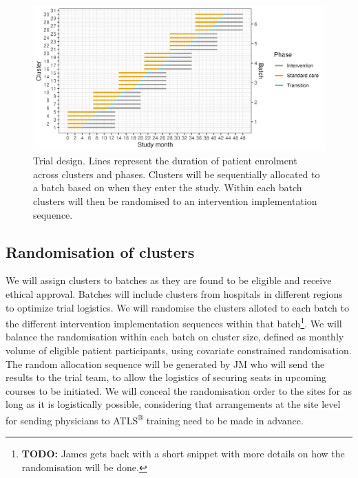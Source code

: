 \documentclass[
]{scrartcl}
\begin{document}
\begin{figure}

{\centering \includegraphics{trial-design-figure-30-clusters-5-sequences-6-batches-6-batches-overlap-4-min-standard-care-4-min-intervention-1-transition-months-0-transition-overlap.png}

}

\caption{\label{fig-trial-design}Trial design. Lines represent the
duration of patient enrolment across clusters and phases. Clusters will
be sequentially allocated to a batch based on when they enter the study.
Within each batch clusters will then be randomised to an intervention
implementation sequence.}

\end{figure}

\hypertarget{randomisation-of-clusters}{%
\subsection{Randomisation of clusters}\label{randomisation-of-clusters}}

We will assign clusters to batches as they are found to be eligible and
receive ethical approval. Batches will include clusters from hospitals
in different regions to optimize trial logistics. We will randomise the
clusters alloted to each batch to the different intervention
implementation sequences within that batch\footnote{\textbf{TODO:} James
  gets back with a short snippet with more details on how the
  randomisation will be done.}. We will balance the randomisation within
each batch on cluster size, defined as monthly volume of eligible
patient participants, using covariate constrained randomisation. The
random allocation sequence will be generated by JM who will send the
results to the trial team, to allow the logistics of securing seats in
upcoming courses to be initiated. We will conceal the randomisation
order to the sites for as long as it is logistically possible,
considering that arrangements at the site level for sending physicians
to ATLS\textsuperscript{®} training need to be made in advance.
\end{document}
